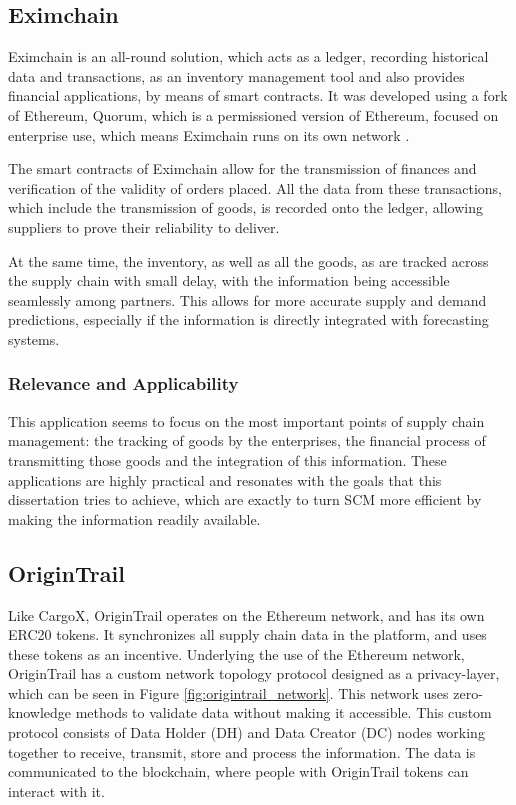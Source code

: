 \subsection{Eximchain}
Eximchain is an all-round solution, which acts as a ledger, recording historical data and transactions, as an inventory management tool and also provides financial applications, by means of smart contracts. It was developed using a fork of Ethereum, Quorum, which is a permissioned version of Ethereum, focused on enterprise use, which means Eximchain runs on its own network \cite{Huertas2017}.


The smart contracts of Eximchain allow for the transmission of finances and verification of the validity of orders placed. All the data from these transactions, which include the transmission of goods, is recorded onto the ledger, allowing suppliers to prove their reliability to deliver. 


At the same time, the inventory, as well as all the goods, as are tracked across the supply chain with small delay, with the information being accessible seamlessly among partners. This allows for more accurate supply and demand predictions, especially if the information is directly integrated with forecasting systems.

\subsubsection{Relevance and Applicability}
This application seems to focus on the most important points of supply chain management: the tracking of goods by the enterprises, the financial process of transmitting those goods and the integration of this information. These applications are highly practical and resonates with the goals that this dissertation tries to achieve, which are exactly to turn SCM more efficient by making the information readily available.

\subsection{OriginTrail}
Like CargoX, OriginTrail operates on the Ethereum network, and has its own ERC20 tokens. It synchronizes all supply chain data in the platform, and uses these tokens as an incentive. Underlying the use of the Ethereum network, OriginTrail has a custom network topology protocol designed as a privacy-layer, which can be seen in Figure \ref{fig:origintrail_network}. This network uses zero-knowledge methods to validate data without making it accessible. This custom protocol consists of Data Holder (DH) and Data Creator (DC) nodes working together to receive, transmit, store and process the information. The data is communicated to the blockchain, where people with OriginTrail tokens can interact with it.


